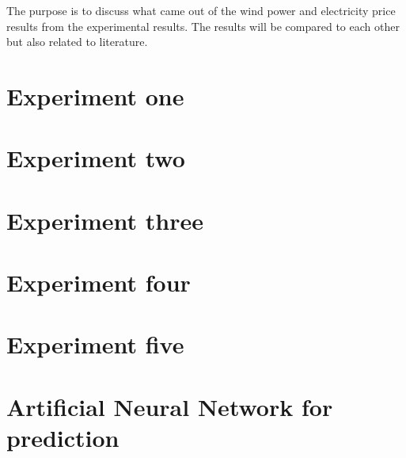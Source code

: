 The purpose is to discuss what came out of the wind power and electricity price results from the experimental results. The results will be compared to each other but also related to literature.

\section{Experiment one}
\label{sec:inputParameterDiscussion}


\section{Experiment two}
\label{sec:matrixTrimmingDiscussion}


\section{Experiment three}
\label{sec:calculatedInputDiscussion}


\section{Experiment four}
\label{sec:blackBoxDiscussion}


\section{Experiment five}
\label{sec:stepAheadForecastingDiscussion}


\section{Artificial Neural Network for prediction}
\label{sec:annForPrediction}


